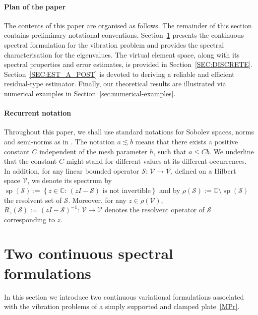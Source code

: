 \documentclass[final,reqno]{elsarticle}
\def\sp{\mathop{\mathrm{sp}}\nolimits}
\begin{document}
\paragraph{Plan of the paper} The contents of this paper are organised as follows. The remainder of this section contains preliminary notational conventions. Section~\ref{Sec:ModPro_Stek} presents the continuous spectral formulation for the vibration problem and provides the spectral characterisation for the eigenvalues. The virtual element space, along with its spectral properties and error estimates, is provided in Section~\ref{SEC:DISCRETE}. Section~\ref{SEC:EST_A_POST} is devoted to deriving a reliable and efficient residual-type estimator. Finally, our theoretical results are illustrated via numerical examples in Section~\ref{sec:numerical-examples}.
 
\paragraph{Recurrent notation} Throughout this paper, we shall use standard notations for Sobolev spaces, norms and semi-norms as in \cite{adams2003sobolev}. The notation $a \lesssim b$ means that there exists a positive constant $C$ independent of the mesh parameter $h$, such that $a\leq C b$. We underline that the constant $C$ might stand for different values at its different occurrences.
In addition, for any linear bounded operator $\mathcal{S}:\,\mathcal{V}\to \mathcal{V}$, defined on a Hilbert space $\mathcal{V}$, we denote its spectrum by 
$\sp(\mathcal{S}):=\left\{z\in\mathbb{C}:\,\left(zI-\mathcal{S}\right)\mbox{ is not
	invertible}\right\}$ and by $\rho(\mathcal{S}):=\mathbb{C}\setminus\sp(\mathcal{\mathcal{S}})$ the resolvent
set of $\mathcal{S}$. Moreover, for any $z\in\rho(\mathcal{V})$,
$R_z(\mathcal{S}):=\left(zI-\mathcal{S}\right)^{-1}:\,\mathcal{V}\to \mathcal{\mathcal{V}}$ denotes the resolvent operator of $\mathcal{S}$ corresponding to $z$.

\section{Two continuous spectral formulations}
\label{Sec:ModPro_Stek}




In this section we introduce two continuous variational formulations associated with the vibration problems of a simply supported and clamped plate~\eqref{MPr}. 
\end{document}

